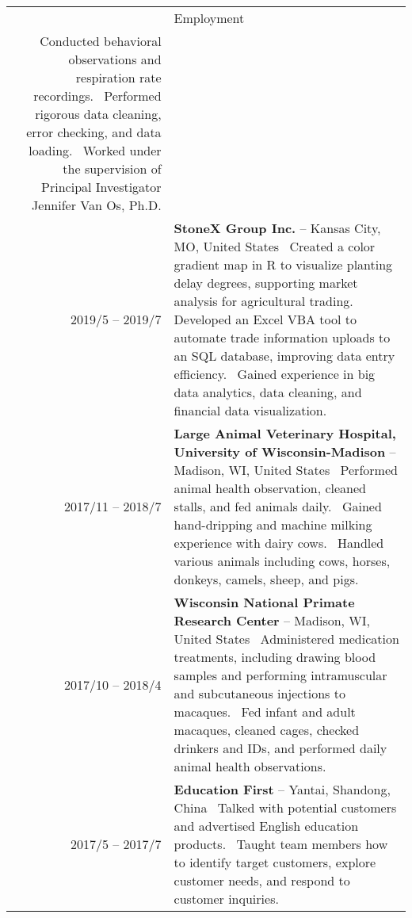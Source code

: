 \documentclass[letterpaper, 11pt]{article}
\newcommand{\headingfont}{\Large\color{OliveGreen}}
\newenvironment{SectionTable}[1]{
	\renewcommand*{\arraystretch}{1.7}
	\setlength{\tabcolsep}{10pt}
	\begin{longtable}{Rp{5.2in}} & #1 \\}
{\end{longtable}\vspace{-.3cm}}
\begin{document}
\begin{SectionTable}{\headingfont Employment}
\textbullet\, Conducted behavioral observations and respiration rate recordings. \newline
\textbullet\, Performed rigorous data cleaning, error checking, and data loading. \newline
\textbullet\, Worked under the supervision of Principal Investigator Jennifer Van Os, Ph.D. \\
2019/5 -- 2019/7 &
\textbf{StoneX Group Inc.} \newline
{} -- Kansas City, MO, United States \newline
\textbullet\, Created a color gradient map in R to visualize planting delay degrees, supporting market analysis for agricultural trading. \newline
\textbullet\, Developed an Excel VBA tool to automate trade information uploads to an SQL database, improving data entry efficiency. \newline
\textbullet\, Gained experience in big data analytics, data cleaning, and financial data visualization.\\
2017/11 -- 2018/7 &
\textbf{Large Animal Veterinary Hospital, University of Wisconsin-Madison} \newline
{} -- Madison, WI, United States \newline
\textbullet\, Performed animal health observation, cleaned stalls, and fed animals daily. \newline
\textbullet\, Gained hand-dripping and machine milking experience with dairy cows. \newline 
\textbullet\, Handled various animals including cows, horses, donkeys, camels, sheep, and pigs. \\
2017/10 -- 2018/4 &
\textbf{Wisconsin National Primate Research Center} \newline
{} -- Madison, WI, United States \newline
\textbullet\, Administered medication treatments, including drawing blood samples and performing intramuscular and subcutaneous injections to macaques. \newline
\textbullet\, Fed infant and adult macaques, cleaned cages, checked drinkers and IDs, and performed daily animal health observations. \\
2017/5 -- 2017/7 &
\textbf{Education First} \newline
{} -- Yantai, Shandong, China \newline
\textbullet\, Talked with potential customers and advertised English education products. \newline
\textbullet\, Taught team members how to identify target customers, explore customer needs, and respond to customer inquiries. \\
\end{SectionTable}
\end{document}
